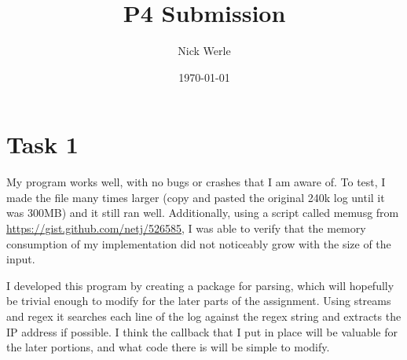 \documentclass[11pt]{article}
\title{P4 Submission}
\author{Nick Werle}
\date{\today}
\begin{document}
	\maketitle
	\section{Task 1}
	My program works well, with no bugs or crashes that I am aware of. To test, I made the file many times larger (copy and pasted the original 240k log until it was 300MB) and it still ran well. Additionally, using a script called memusg from \url{https://gist.github.com/netj/526585}, I was able to verify that the memory consumption of my implementation did not noticeably grow with the size of the input.
	
	I developed this program by creating a package for parsing, which will hopefully be trivial enough to modify for the later parts of the assignment. Using streams and regex it searches each line of the log against the regex string and extracts the IP address if possible. I think the callback that I put in place will be valuable for the later portions, and what code there is will be simple to modify.
\end{document}
